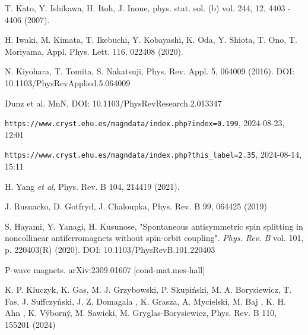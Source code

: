 \documentclass[prb,showpacs,amsmath,amssymb,superscriptaddress,twocolumn,floatfix]{revtex4-1}
\begin{document}
\begin{thebibliography}{99}
 T. Kato, Y. Ishikawa, H. Itoh, J. Inoue, phys. stat. sol. (b) vol. 244, 12, 4403 - 4406 (2007). %

 H. Iwaki, M. Kimata, T. Ikebuchi, Y. Kobayashi, K. Oda, Y. Shiota, T. Ono, T. Moriyama,  Appl. Phys. Lett. 116, 022408 (2020). %

 N. Kiyohara, T. Tomita, S. Nakatsuji, Phys. Rev. Appl. 5, 064009 (2016). DOI: 10.1103/PhysRevApplied.5.064009

 Dunz et al. MnN, DOI: 10.1103/PhysRevResearch.2.013347

\texttt{https://www.cryst.ehu.es/magndata/index.php?index=0.199}, 2024-08-23, 12:01

 \texttt{https://www.cryst.ehu.es/magndata/index.php?this\_label=2.35}, 2024-08-14, 15:11

 H. Yang \textit{et al}, Phys. Rev. B 104, 214419 (2021).
    
 J. Rusnacko, D. Gotfryd, J. Chaloupka, Phys. Rev. B 99, 064425 (2019)

 S. Hayami, Y. Yanagi, H. Kusunose, "Spontaneous antisymmetric spin splitting in noncollinear antiferromagnets without spin-orbit coupling". \textit{Phys. Rev. B} vol. 101, p. 220403(R) (2020). DOI: 10.1103/PhysRevB.101.220403

 P-wave magnets. arXiv:2309.01607 [cond-mat.mes-hall]

 K. P. Kluczyk, K. Gas, M. J. Grzybowski, P. Skupi\'nski, M. A. Borysiewicz, T. Fas, J. Suffczy\'nski, J. Z. Domagala , K. Grasza, A. Mycielski, M. Baj , K. H. Ahn , K. V\'yborn\'y, M. Sawicki, M. Gryglas-Borysiewicz, Phys. Rev. B 110, 155201 (2024)

    
\end{thebibliography}
\end{document}
